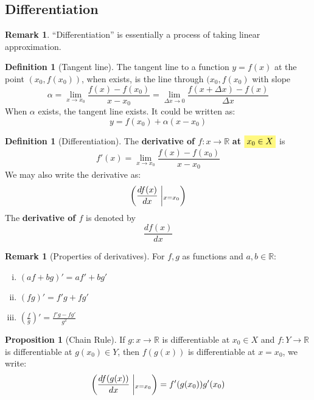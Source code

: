 \documentclass[12pt]{article}
\newcommand{\R}{{\mathbb R}}
\theoremstyle{definition}
\newtheorem{definition}[theorem]{Definition}
\newtheorem{proposition}[theorem]{Proposition}
\newtheorem{remark}[theorem]{Remark}
\theoremstyle{plain}
\newcommand{\highlight}[1]{%
 \colorbox{yellow!50}{$\displaystyle#1$}}
\newcommand{\suchthat}{\;\ifnum\currentgrouptype=16 \middle\fi|\;}
\begin{document}
\subsection{Differentiation}
\setcounter{theorem}{0}
\begin{remark}
    ``Differentiation'' is essentially a process of taking linear approximation.
\end{remark}

\begin{definition}
    [Tangent line]
    The tangent line to a function $y = f(x)$ at the point $(x_0,
    f(x_0))$, when exists, is
    the line through $(x_0, f(x_0)$ with slope
        \[
            \alpha = \lim_{x \to x_0} \frac{f(x) - f(x_0)}{x - x_0} =
            \lim_{\Delta x \to 0 } \frac{f(x + \Delta x) - f(x)}{\Delta x}
        \]
    When $\alpha$ exists, the tangent line exists. It could be written as:
    \[
        y = f(x_0) + \alpha(x - x_0)
    \]
\end{definition}

\begin{definition}
    [Differentiation]
    The \textbf{derivative of $f: x \to \R$} {\textbf{at} $\highlight{x_0 \in X}$} is
    \[
        f'(x) = \lim_{x \to x_0} \frac{f(x) - f(x_0)}{ x - x_0}
    \]
    We may also write the derivative as:
    \[
        \mleft( \frac{df(x)}{dx} \;\middle|_{x = x_0}
        \mright)
    \]
    The \textbf{derivative of $f$} is denoted by
    \[
        \frac{df(x)}{dx}
    \]
\end{definition}


\begin{remark}
    [Properties of derivatives] For $f,g$ as functions and $a,b \in \R$:
    \begin{enumerate}[(i)]
        \item $(a f + b g) ' = a f' + b g'$
        \item $(fg)' = f'g + fg'$
        \item $\left( \frac{f}{g} \right)' = \frac{f'g - fg'}{g^2}$
    \end{enumerate}
\end{remark}
\begin{proposition}
    [Chain Rule] If $g: x\to \R$ is differentiable at $x_0 \in X$ and $f: Y \to
    \R$ is differentiable at $g(x_0) \in Y$, then $f(g(x))$ is differentiable at
    $x = x_0$, we write:
    \[
        \mleft(
            \frac{df(g(x))}{dx} \;\middle|_{x = x_0}
        \mright)
        = f'(g(x_0)) g'(x_0)
    \]
\end{proposition}
\end{document}
